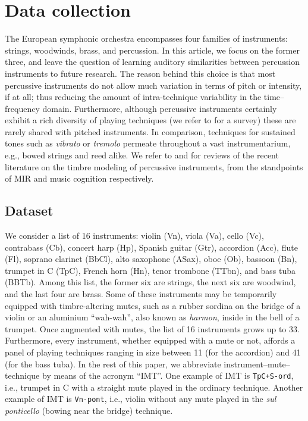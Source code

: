 \documentclass{bmcart}
\makeatletter
\newcommand{\nmu}{}
\newcommand*{\eg}{e.g.,\@\xspace}
\newcommand*{\ie}{i.e.,\@\xspace}
\makeatother
\begin{document}

\section*{\nmu Data collection}
\label{sec:survey}

The European symphonic orchestra encompasses four families of instruments: strings, woodwinds, brass, and percussion.
In this article, we focus on the former three, and leave the question of learning auditory similarities between percussion instruments to future research.
The reason behind this choice is that most percussive instruments do not allow much variation in terms of pitch or intensity, if at all; thus reducing the amount of intra-technique variability in the time--frequency domain.
Furthermore, although percussive instruments certainly exhibit a rich diversity of playing techniques (we refer to \cite{peinkofer1976book} for a survey) these are rarely shared with pitched instruments.
In comparison, techniques for sustained tones such as \emph{vibrato} or \emph{tremolo} permeate throughout a vast instrumentarium, \eg{} bowed strings and reed alike.
We refer to \cite{wu2018taslp} and \cite{pearce2019appliedsciences} for reviews of the recent literature on the timbre modeling of percussive instruments, from the standpoints of MIR and music cognition respectively.

\subsection*{Dataset}
We consider a list of 16 instruments: violin (Vn), viola (Va), cello (Vc), contrabass (Cb), concert harp (Hp), Spanish guitar (Gtr), accordion (Acc), flute (Fl), soprano clarinet (BbCl), alto saxophone (ASax), oboe (Ob), bassoon (Bn), trumpet in C (TpC), French horn (Hn), tenor trombone (TTbn), and bass tuba (BBTb).
Among this list, the former six are strings, the next six are woodwind, and the last four are brass.
Some of these instruments may be temporarily equipped with timbre-altering mutes, such as a rubber sordina on the bridge of a violin or an aluminium ``wah-wah'', also known as \emph{harmon}, inside in the bell of a trumpet.
Once augmented with mutes, the list of 16 instruments grows up to 33.
Furthermore, every instrument, whether equipped with a mute or not, affords a panel of playing techniques ranging in size between 11 (for the accordion) and 41 (for the bass tuba).
In the rest of this paper, we abbreviate instrument--mute--technique by means of the acronym ``IMT''.
One example of IMT is \texttt{TpC+S-ord}, \ie{} trumpet in C with a straight mute played in the ordinary technique.
Another example of IMT is \texttt{Vn-pont}, \ie{} violin without any mute played in the \emph{sul ponticello} (bowing near the bridge) technique.
\end{document}
